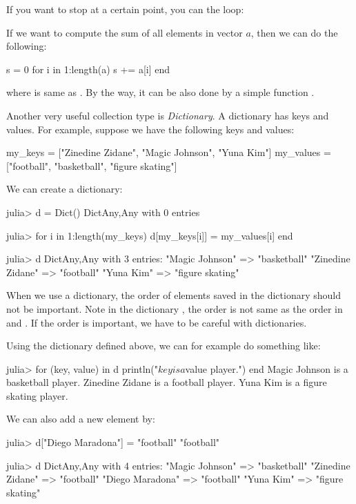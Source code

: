If you want to stop at a certain point, you can  the loop:

If we want to compute the sum of all elements in vector $a$, then we can do the following:
\begin{code}
s = 0
for i in 1:length(a)
	s += a[i]
end
\end{code}
\noindent where  is same as . By the way, it can be also done by a simple function .

Another very useful collection type is \emph{Dictionary}. A dictionary has keys and values. For example, suppose we have the following keys and values:
\begin{code}
my_keys = ["Zinedine Zidane", "Magic Johnson", "Yuna Kim"]
my_values = ["football", "basketball", "figure skating"]
\end{code}
\noindent We can create a dictionary:
\begin{code}
julia> d = Dict()
Dict{Any,Any} with 0 entries

julia> for i in 1:length(my_keys)
           d[my_keys[i]] = my_values[i]
       end

julia> d
Dict{Any,Any} with 3 entries:
  "Magic Johnson"   => "basketball"
  "Zinedine Zidane" => "football"
  "Yuna Kim"        => "figure skating"
\end{code}
\noindent When we use a dictionary, the order of elements saved in the dictionary should not be important. Note in the dictionary , the order is not same as the order in  and . If the order is important, we have to be careful with dictionaries.

Using the dictionary  defined above, we can for example do something like:
\begin{code}
julia> for (key, value) in d
       	println("$key is a $value player.")
       end
Magic Johnson is a basketball player.
Zinedine Zidane is a football player.
Yuna Kim is a figure skating player.
\end{code}

We can also add a new element by:
\begin{code}
julia> d["Diego Maradona"] = "football"
"football"

julia> d
Dict{Any,Any} with 4 entries:
  "Magic Johnson"   => "basketball"
  "Zinedine Zidane" => "football"
  "Diego Maradona"  => "football"
  "Yuna Kim"        => "figure skating"
\end{code}

